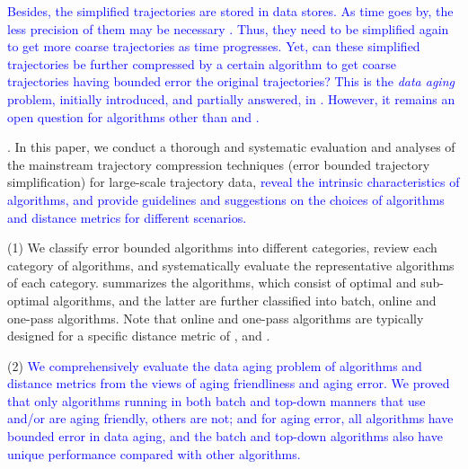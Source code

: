 \textcolor{blue}{Besides, the simplified trajectories are stored in data stores. As time goes by, the less precision of them may be necessary \cite{Cao:Spatio}. Thus, they need to be simplified again to get more coarse trajectories as time progresses. Yet, can these simplified trajectories be further compressed by a certain \lsa algorithm to get coarse trajectories having bounded error \wrt the original trajectories? This is the \emph{data aging} problem, initially introduced, and partially answered, in \cite{Cao:Spatio}. However, it remains an open question for \lsa algorithms other than \opt and \dpa.}




.
In this paper, we conduct a thorough and systematic evaluation and analyses of the mainstream trajectory compression techniques (\ie error bounded trajectory simplification) for large-scale trajectory data, \textcolor{blue}{reveal the intrinsic characteristics of algorithms, and provide guidelines and suggestions on the choices of algorithms and distance metrics for different scenarios.}

\stab (1) We classify error bounded \lsa algorithms into different categories, review each category of algorithms, and systematically evaluate the representative algorithms of each category.
%
 summarizes the algorithms, which consist of optimal and sub-optimal algorithms, and the latter are further classified into batch, online and one-pass algorithms.
Note that online and one-pass algorithms are typically designed for a specific distance metric of \ped, \sed and \dad.

\stab (2) \textcolor{blue}{We comprehensively evaluate the data aging problem of \lsa algorithms and distance metrics from the views of aging friendliness and aging error. We proved that only algorithms running in both batch and top-down manners that use \ped and/or \sed are aging friendly, others are not; and for aging error, all algorithms have bounded error in data aging, and the batch and top-down algorithms also have unique performance compared with other algorithms.}

